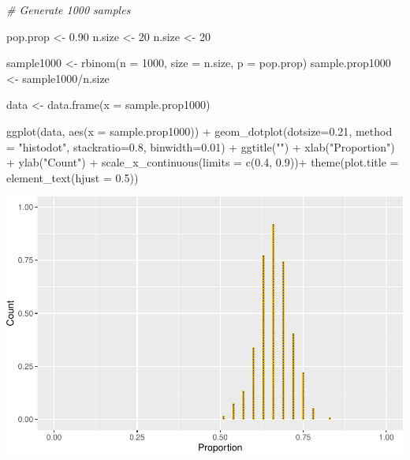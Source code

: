 \documentclass[
]{book}
\newenvironment{Shaded}{\begin{snugshade}}{\end{snugshade}}
\newcommand{\AttributeTok}[1]{\textcolor[rgb]{0.77,0.63,0.00}{#1}}
\newcommand{\CommentTok}[1]{\textcolor[rgb]{0.56,0.35,0.01}{\textit{#1}}}
\newcommand{\DecValTok}[1]{\textcolor[rgb]{0.00,0.00,0.81}{#1}}
\newcommand{\FloatTok}[1]{\textcolor[rgb]{0.00,0.00,0.81}{#1}}
\newcommand{\FunctionTok}[1]{\textcolor[rgb]{0.00,0.00,0.00}{#1}}
\newcommand{\NormalTok}[1]{#1}
\newcommand{\OtherTok}[1]{\textcolor[rgb]{0.56,0.35,0.01}{#1}}
\newcommand{\SpecialCharTok}[1]{\textcolor[rgb]{0.00,0.00,0.00}{#1}}
\newcommand{\StringTok}[1]{\textcolor[rgb]{0.31,0.60,0.02}{#1}}
\begin{document}
\begin{Shaded}
\begin{Highlighting}[]
\CommentTok{\# Generate 1000 samples}

\NormalTok{pop.prop }\OtherTok{\textless{}{-}} \FloatTok{0.90}
\NormalTok{n.size }\OtherTok{\textless{}{-}} \DecValTok{20}
\NormalTok{n.size }\OtherTok{\textless{}{-}} \DecValTok{20}

\NormalTok{sample1000 }\OtherTok{\textless{}{-}} \FunctionTok{rbinom}\NormalTok{(}\AttributeTok{n =} \DecValTok{1000}\NormalTok{, }\AttributeTok{size =}\NormalTok{ n.size, }\AttributeTok{p =}\NormalTok{ pop.prop)  }
\NormalTok{sample.prop1000 }\OtherTok{\textless{}{-}}\NormalTok{ sample1000}\SpecialCharTok{/}\NormalTok{n.size }

\NormalTok{data }\OtherTok{\textless{}{-}} \FunctionTok{data.frame}\NormalTok{(}\AttributeTok{x =}\NormalTok{ sample.prop1000)}

\FunctionTok{ggplot}\NormalTok{(data, }\FunctionTok{aes}\NormalTok{(}\AttributeTok{x =}\NormalTok{ sample.prop1000)) }\SpecialCharTok{+}
  \FunctionTok{geom\_dotplot}\NormalTok{(}\AttributeTok{dotsize=}\FloatTok{0.21}\NormalTok{, }\AttributeTok{method =} \StringTok{"histodot"}\NormalTok{, }\AttributeTok{stackratio=}\FloatTok{0.8}\NormalTok{, }\AttributeTok{binwidth=}\FloatTok{0.01}\NormalTok{) }\SpecialCharTok{+}
  \FunctionTok{ggtitle}\NormalTok{(}\StringTok{""}\NormalTok{) }\SpecialCharTok{+}  \FunctionTok{xlab}\NormalTok{(}\StringTok{"Proportion"}\NormalTok{) }\SpecialCharTok{+} \FunctionTok{ylab}\NormalTok{(}\StringTok{"Count"}\NormalTok{) }\SpecialCharTok{+}
  \FunctionTok{scale\_x\_continuous}\NormalTok{(}\AttributeTok{limits =} \FunctionTok{c}\NormalTok{(}\FloatTok{0.4}\NormalTok{, }\FloatTok{0.9}\NormalTok{))}\SpecialCharTok{+} 
  \FunctionTok{theme}\NormalTok{(}\AttributeTok{plot.title =} \FunctionTok{element\_text}\NormalTok{(}\AttributeTok{hjust =} \FloatTok{0.5}\NormalTok{))}
\end{Highlighting}
\end{Shaded}

\includegraphics[width=1\linewidth]{Class_Activity_7_files/figure-latex/unnamed-chunk-12-1}
\end{document}
